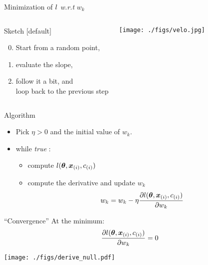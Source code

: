 \begin{frame}{Minimization of  $l$ \textit{w.r.t} $w_k$}

  \begin{columns}[c]
    
    \begin{block}{Sketch}
      [default]
      \begin{enumerate} \setcounter{enumi}{-1}
      \item Start from a random point, 
      \item evaluate the slope, 
      \item follow it a bit, and \\loop back to the previous step
    \end{enumerate}
    \end{block}
    
    \begin{center}
      \texttt{[image: ./figs/velo.jpg]}
    \end{center}
    
  \end{columns}

  \begin{block}{Algorithm}
    \begin{itemize}
    \item Pick $\eta>0$ and the initial value of $w_k$.
    \item while \textit{true} :
      \begin{itemize}
      \item compute $l(\boldsymbol{\theta},\boldsymbol{x}_{(i)},{c}_{(i)})$

      \item compute the derivative and update $w_k$
$$      w_k= w_k - \eta \frac{\partial l(\boldsymbol{\theta},\boldsymbol{x}_{(i)},{c}_{(i)}) }{\partial
  w_k}
$$
\end{itemize}
\end{itemize}
\end{block}
\end{frame}

\begin{frame}{``Convergence'' }
At the minimum: 
  $$
\frac{\partial l(\boldsymbol{\theta},\boldsymbol{x}_{(i)},{c}_{(i)}) }{\partial
  w_k}  = 0
$$
\begin{center}
  \texttt{[image: ./figs/derive\_null.pdf]}
\end{center}

\end{frame}


